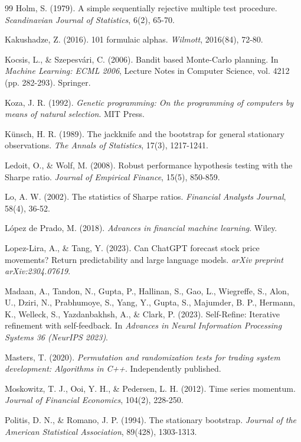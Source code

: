 \documentclass[12pt,a4paper,oneside]{book}
\theoremstyle{definition}
\begin{document}
\begin{thebibliography}{99}
Holm, S. (1979). A simple sequentially rejective multiple test procedure. \textit{Scandinavian Journal of Statistics}, 6(2), 65-70.

Kakushadze, Z. (2016). 101 formulaic alphas. \textit{Wilmott}, 2016(84), 72-80.

Kocsis, L., \& Szepesv\'ari, C. (2006). Bandit based Monte-Carlo planning. In \textit{Machine Learning: ECML 2006}, Lecture Notes in Computer Science, vol. 4212 (pp. 282-293). Springer.

Koza, J. R. (1992). \textit{Genetic programming: On the programming of computers by means of natural selection}. MIT Press.

K\"unsch, H. R. (1989). The jackknife and the bootstrap for general stationary observations. \textit{The Annals of Statistics}, 17(3), 1217-1241.

Ledoit, O., \& Wolf, M. (2008). Robust performance hypothesis testing with the Sharpe ratio. \textit{Journal of Empirical Finance}, 15(5), 850-859.

Lo, A. W. (2002). The statistics of Sharpe ratios. \textit{Financial Analysts Journal}, 58(4), 36-52.

L\'opez de Prado, M. (2018). \textit{Advances in financial machine learning}. Wiley.

Lopez-Lira, A., \& Tang, Y. (2023). Can ChatGPT forecast stock price movements? Return predictability and large language models. \textit{arXiv preprint arXiv:2304.07619}.

Madaan, A., Tandon, N., Gupta, P., Hallinan, S., Gao, L., Wiegreffe, S., Alon, U., Dziri, N., Prabhumoye, S., Yang, Y., Gupta, S., Majumder, B. P., Hermann, K., Welleck, S., Yazdanbakhsh, A., \& Clark, P. (2023). Self-Refine: Iterative refinement with self-feedback. In \textit{Advances in Neural Information Processing Systems 36 (NeurIPS 2023)}.

Masters, T. (2020). \textit{Permutation and randomization tests for trading system development: Algorithms in C++}. Independently published.

Moskowitz, T. J., Ooi, Y. H., \& Pedersen, L. H. (2012). Time series momentum. \textit{Journal of Financial Economics}, 104(2), 228-250.

Politis, D. N., \& Romano, J. P. (1994). The stationary bootstrap. \textit{Journal of the American Statistical Association}, 89(428), 1303-1313.


\end{thebibliography}
\end{document}

